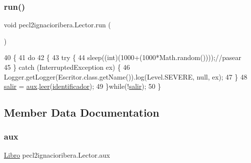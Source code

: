 \subsubsection{\texorpdfstring{run()}{run()}}
{\footnotesize\ttfamily void pecl2ignacioribera.\+Lector.\+run (\begin{DoxyParamCaption}{ }\end{DoxyParamCaption})\hspace{0.3cm}{\ttfamily [inline]}}


\begin{DoxyCode}
40      \{
41          \textcolor{keywordflow}{do}
42          \{
43              \textcolor{keywordflow}{try} \{
44                 sleep((\textcolor{keywordtype}{int})(1000+(1000*Math.random())));\textcolor{comment}{//pasear}
45             \} \textcolor{keywordflow}{catch} (InterruptedException ex) \{
46                 Logger.getLogger(Escritor.class.getName()).log(Level.SEVERE, null, ex);
47             \}
48             \mbox{\hyperlink{classpecl2ignacioribera_1_1_lector_a74648948a44c99203ad02aa50e9df5dc}{salir}} = \mbox{\hyperlink{classpecl2ignacioribera_1_1_lector_a6036872628f80d526e0d2dc874811b36}{aux}}.\mbox{\hyperlink{classpecl2ignacioribera_1_1_libro_ae907d7ff683317468cf2772211b5289c}{leer}}(\mbox{\hyperlink{classpecl2ignacioribera_1_1_lector_a5ac527a198591eefd058ee83f6f0837e}{identificador}});
49          \}\textcolor{keywordflow}{while}(!\mbox{\hyperlink{classpecl2ignacioribera_1_1_lector_a74648948a44c99203ad02aa50e9df5dc}{salir}});
50      \}
\end{DoxyCode}


\subsection{Member Data Documentation}
\mbox{\label{classpecl2ignacioribera_1_1_lector_a6036872628f80d526e0d2dc874811b36}} 
\subsubsection{\texorpdfstring{aux}{aux}}
{\footnotesize\ttfamily \mbox{\hyperlink{classpecl2ignacioribera_1_1_libro}{Libro}} pecl2ignacioribera.\+Lector.\+aux\hspace{0.3cm}{\ttfamily [package]}}

